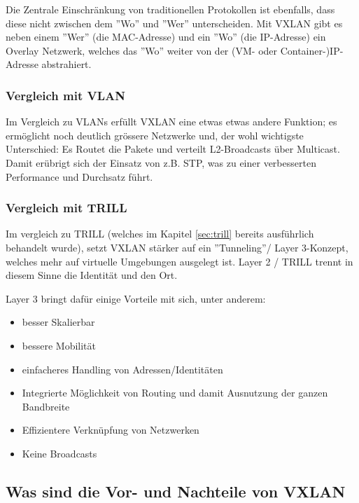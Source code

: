 Die Zentrale Einschränkung von traditionellen Protokollen ist ebenfalls, dass diese nicht zwischen dem ''Wo'' und ''Wer'' unterscheiden. Mit VXLAN gibt es neben einem ''Wer'' (die MAC-Adresse) und ein ''Wo'' (die IP-Adresse) ein Overlay Netzwerk, welches das ''Wo'' weiter von der (VM- oder Container-)IP-Adresse abstrahiert.

\subsubsection{Vergleich mit VLAN}

Im Vergleich zu VLANs erfüllt VXLAN eine etwas etwas andere Funktion; es ermöglicht noch deutlich grössere Netzwerke und, der wohl wichtigste Unterschied: Es Routet die Pakete und verteilt L2-Broadcasts über Multicast. Damit erübrigt sich der Einsatz von z.B. STP, was zu einer verbesserten Performance und Durchsatz führt.

\subsubsection{Vergleich mit TRILL}

Im vergleich zu TRILL (welches im Kapitel \ref{sec:trill} bereits ausführlich behandelt wurde), setzt VXLAN stärker auf ein ''Tunneling''/ Layer 3-Konzept, welches mehr auf virtuelle Umgebungen ausgelegt ist. Layer 2 / TRILL trennt in diesem Sinne die Identität und den Ort.

Layer 3 bringt dafür einige Vorteile mit sich, unter anderem:

\begin{itemize}
	\item besser Skalierbar
	\item bessere Mobilität
	\item einfacheres Handling von Adressen/Identitäten
	\item Integrierte Möglichkeit von Routing und damit Ausnutzung der ganzen Bandbreite
	\item Effizientere Verknüpfung von Netzwerken
	\item Keine Broadcasts
\end{itemize}

\subsection{Was sind die Vor- und Nachteile von VXLAN}

